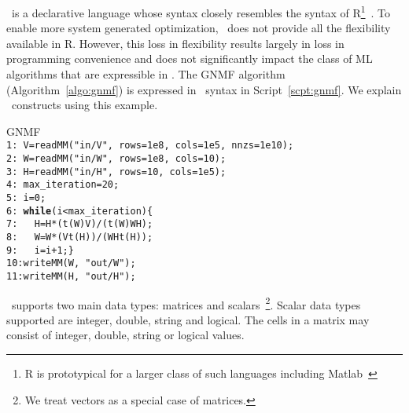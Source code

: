 

\dmlr\ is a declarative language whose syntax closely resembles 
the syntax of R\footnote{R is prototypical for a larger class of such languages including
Matlab~\cite{matlab}}~\cite{R}. To enable more system generated optimization, \dmlr\ does not
provide all the flexibility available in R. However, this loss in flexibility results largely in
loss in programming convenience and does not significantly impact the class of ML algorithms that
are expressible in \dmlr.
The GNMF algorithm (Algorithm~\ref{algo:gnmf}) is expressed in
\dmlr\ syntax in Script~\ref{scpt:gnmf}. We explain \dmlr\
constructs using this example.
\\ 
\begin{script}\label{scpt:gnmf}
GNMF\\
\footnotesize
\texttt{1:\ V=readMM("in/V", rows=1e8, cols=1e5, nnzs=1e10);\\
2:\ W=readMM("in/W", rows=1e8, cols=10);\\
3:\ H=readMM("in/H", rows=10, cols=1e5);\\
4:\ max\_iteration=20;\\
5:\ i=0;\\
6:\ \textbf{while}(i<max\_iteration)\{\\
7:\ \ \ H=H*(t(W)\mmult V)/(t(W)\mmult W\mmult H);\\
8:\ \ \ W=W*(V\mmult t(H))/(W\mmult H\mmult t(H));\\
9:\ \ \ i=i+1;\}\\
10:writeMM(W, "out/W");\\
11:writeMM(H, "out/H");}
\end{script}
\vspace*{0.1in}

 \dmlr\ supports two main data types: matrices and 
scalars~\footnote{We treat vectors as a special case of matrices.}. Scalar 
data types supported are integer, double, string and logical. The cells in a matrix may 
consist of integer, double, string or logical values.

